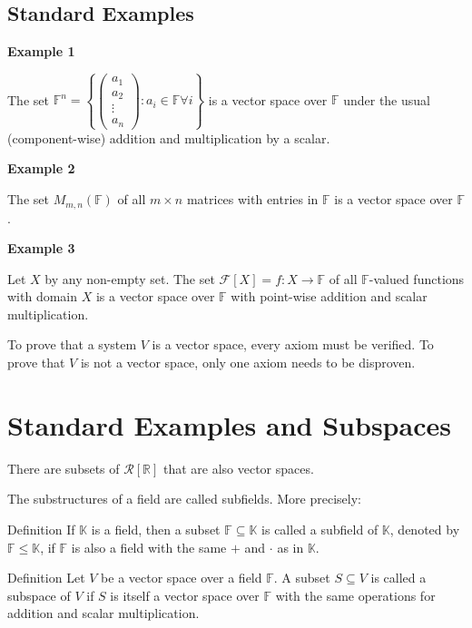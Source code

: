 \documentclass{report}
\newcommand{\cvec}[1]{ \begin{pmatrix} #1 \end{pmatrix} }
\begin{document}
\begin{enumerate}
	\section{Standard Examples}

		\textbf{Example 1}

		The set $\mathbb{F}^n = \left\{\cvec{a_1\\a_2\\\vdots\\a_n}: a_i \in \mathbb{F} \forall i \right\}$ is a vector space over $\mathbb{F}$ under the usual (component-wise) addition and multiplication by a scalar.

		\textbf{Example 2}

		The set $M_{m,n}(\mathbb{F})$ of all $m \times n$ matrices with entries in $\mathbb{F}$ is a vector space over $\mathbb{F}$.
		
		\textbf{Example 3}

		Let $X$ by any non-empty set. The set  $\mathcal{F}[X] = {f: X \rightarrow \mathbb{F}}$ of all $\mathbb{F}$-valued functions with domain $X$ is a vector space over $\mathbb{F}$ with point-wise addition and scalar multiplication.

		To prove that a system $V$ is a vector space, every axiom must be verified. To prove that $V$ is not a vector space, only one axiom needs to be disproven.
		
\chapter{Standard Examples and Subspaces}	

	There are subsets of $\mathcal{R}[\mathbb{R}]$ that are also vector spaces.

	The substructures of a field are called subfields. More precisely:

	\begin{question}{Definition}
		If $\mathbb{K}$ is a field, then a subset $\mathbb{F} \subseteq \mathbb{K}$ is called a subfield of $\mathbb{K}$, denoted by $\mathbb{F} \leq \mathbb{K}$, if $\mathbb{F}$ is also a field with the same $+$ and $\cdot$ as in $\mathbb{K}$.
	\end{question}
	\begin{question}{Definition}
		Let $V$ be a vector space over a field $\mathbb{F}$. A subset $S \subseteq V$ is called a subspace of $V$ if $S$ is itself a vector space over $\mathbb{F}$ with the same operations for addition and scalar multiplication.


\end{question}
\end{enumerate}
\end{document}

